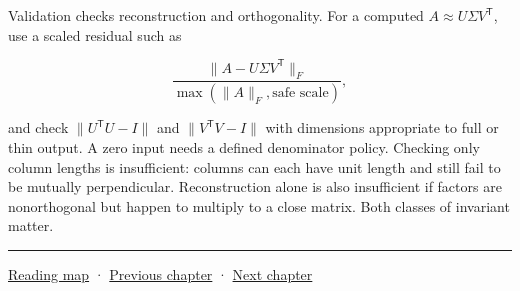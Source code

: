 Validation checks reconstruction and orthogonality. For a computed \(A\approx U\Sigma V^\mathsf T\), use a scaled residual such as

\[
\frac{\|A-U\Sigma V^\mathsf T\|_F}
{\max(\|A\|_F,\text{safe scale})},
\]

and check \(\|U^\mathsf TU-I\|\) and \(\|V^\mathsf TV-I\|\) with dimensions appropriate to full or thin output. A zero input needs a defined denominator policy. Checking only column lengths is insufficient: columns can each have unit length and still fail to be mutually perpendicular. Reconstruction alone is also insufficient if factors are nonorthogonal but happen to multiply to a close matrix. Both classes of invariant matter.

\begin{center}\rule{0.5\linewidth}{0.5pt}\end{center}

\hyperref[volume-reading-map]{Reading map} · \hyperref[02-foundations-ii-ch023-probability-models-and-measurement-error]{Previous chapter} · \hyperref[02-foundations-ii-ch025-continuous-models-and-numerical-error]{Next chapter}
